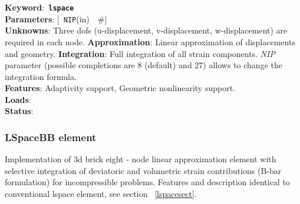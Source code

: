 \documentclass[a4paper]{article}
\newcommand{\descitem}[1]{{\noindent \bf #1}:}
\newcommand{\elemkeyword}[1]{\descitem{Keyword}~{\bf \texttt{#1}}}
\newcommand{\elemparam}[2]{{{\texttt{#1}\tiny (#2)}~~\#}}
\newcommand{\optelemparam}[2]{{[~\elemparam{#1}{#2}]}}
\newcommand{\param}[1]{{\em #1}}
\begin{document}
\elemkeyword{lspace}\\
\descitem{Parameters} \optelemparam{NIP}{in}\\
\descitem{Unknowns}
Three dofs (u-displacement, v-displacement, w-displacement) are required in each node.
\descitem{Approximation} Linear approximation of displacements and
geometry.
\descitem{Integration}
Full integration of all strain components.
\param{NIP} parameter (possible completions are 8 (default) and 27)
allows to change the integration formula.\\
\descitem{Features} Adaptivity support, Geometric nonlinearity support.\\
\descitem{Loads} \\
\descitem{Status} 

\subsubsection{LSpaceBB element}
Implementation of 3d brick  eight - node 
linear approximation element with selective integration of deviatoric and volumetric strain contributions (B-bar formulation) for incompressible problems. Features and description identical to conventional lspace element, see section ~\ref{lspacesect}.
\end{document}
